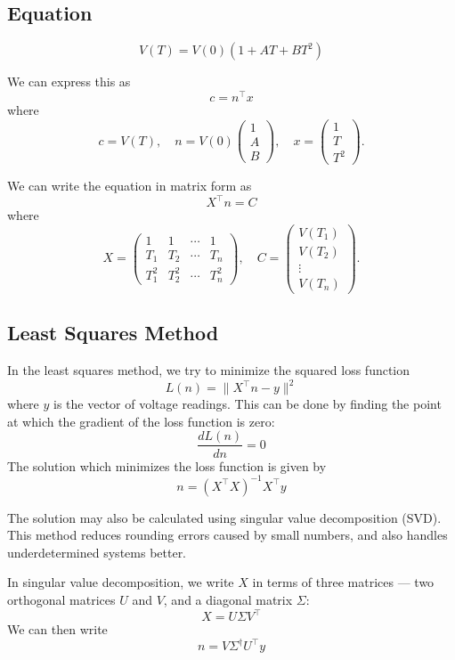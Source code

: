\documentclass{article}
\begin{document}
\subsection*{Equation}

\begin{equation}
V(T) = V(0)(1 + AT + BT^2)
\end{equation}

We can express this as
\[
c = n^\top x
\]
where
\[
c = V(T), \quad n = V(0)
\begin{pmatrix}
1 \\ A \\ B
\end{pmatrix},
\quad
x =
\begin{pmatrix}
1 \\ T \\ T^2
\end{pmatrix}.
\]

We can write the equation in matrix form as
\[
X^\top n = C
\]
where
\[
X =
\begin{pmatrix}
1 & 1 & \cdots & 1 \\
T_1 & T_2 & \cdots & T_n \\
T_1^2 & T_2^2 & \cdots & T_n^2
\end{pmatrix},
\quad
C =
\begin{pmatrix}
V(T_1) \\ V(T_2) \\ \vdots \\ V(T_n)
\end{pmatrix}.
\]
\subsection*{Least Squares Method}

In the least squares method, we try to minimize the squared loss function
\[
L(n) = \| X^\top n - y \|^2
\]
where $y$ is the vector of voltage readings. This can be done by finding the point at which the gradient of the loss function is zero:
\[
\frac{dL(n)}{dn} = 0
\]
The solution which minimizes the loss function is given by
\[
n = (X^\top X)^{-1} X^\top y
\]

The solution may also be calculated using singular value decomposition (SVD). This method reduces rounding errors caused by small numbers, and also handles underdetermined systems better.

In singular value decomposition, we write $X$ in terms of three matrices — two orthogonal matrices $U$ and $V$, and a diagonal matrix $\Sigma$:
\[
X = U \Sigma V^\top
\]
We can then write
\[
n = V \Sigma^{\dagger} U^\top y
\]
\end{document}
